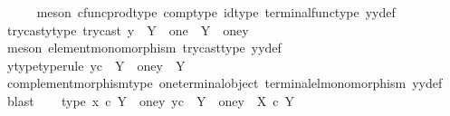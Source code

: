 \begin{isabellebody}
\ \ \ \ \isamarkupfalse%
\ {\isacharparenleft}{\kern0pt}meson\ cfunc{\isacharunderscore}{\kern0pt}prod{\isacharunderscore}{\kern0pt}type\ comp{\isacharunderscore}{\kern0pt}type\ id{\isacharunderscore}{\kern0pt}type\ terminal{\isacharunderscore}{\kern0pt}func{\isacharunderscore}{\kern0pt}type\ y{}y{}{\isacharunderscore}{\kern0pt}def{\isacharparenright}{\kern0pt}\isanewline
\ \ \isamarkupfalse%
\ trycast{\isacharunderscore}{\kern0pt}y{}{\isacharunderscore}{\kern0pt}type{\isacharcolon}{\kern0pt}\ {\isachardoublequoteopen}try{\isacharunderscore}{\kern0pt}cast\ y{}\ {\isacharcolon}{\kern0pt}\ Y\ {\isasymrightarrow}\ one\ {\isasymCoprod}\ {\isacharparenleft}{\kern0pt}Y\ {\isasymsetminus}\ {\isacharparenleft}{\kern0pt}one{\isacharcomma}{\kern0pt}y{}{\isacharparenright}{\kern0pt}{\isacharparenright}{\kern0pt}{\isachardoublequoteclose}\isanewline
\ \ \ \ \isamarkupfalse%
\ {\isacharparenleft}{\kern0pt}meson\ element{\isacharunderscore}{\kern0pt}monomorphism\ try{\isacharunderscore}{\kern0pt}cast{\isacharunderscore}{\kern0pt}type\ y{}y{}{\isacharunderscore}{\kern0pt}def{\isacharparenright}{\kern0pt}\isanewline
\ \ \isamarkupfalse%
\ y{}{\isacharprime}{\kern0pt}{\isacharunderscore}{\kern0pt}type{\isacharbrackleft}{\kern0pt}type{\isacharunderscore}{\kern0pt}rule{\isacharbrackright}{\kern0pt}{\isacharcolon}{\kern0pt}\ {\isachardoublequoteopen}y{}\isactrlsup c\ {\isacharcolon}{\kern0pt}\ Y\ {\isasymsetminus}\ {\isacharparenleft}{\kern0pt}one{\isacharcomma}{\kern0pt}y{}{\isacharparenright}{\kern0pt}\ {\isasymrightarrow}\ Y{\isachardoublequoteclose}\isanewline
\ \ \ \ \isamarkupfalse%
\ complement{\isacharunderscore}{\kern0pt}morphism{\isacharunderscore}{\kern0pt}type\ one{\isacharunderscore}{\kern0pt}terminal{\isacharunderscore}{\kern0pt}object\ terminal{\isacharunderscore}{\kern0pt}el{\isacharunderscore}{\kern0pt}monomorphism\ y{}y{}{\isacharunderscore}{\kern0pt}def\ \isamarkupfalse%
\ blast\isanewline
\ \ \isamarkupfalse%
\ type{}{\isacharcolon}{\kern0pt}\ {\isachardoublequoteopen}{\isasymlangle}x{}\ {\isasymcirc}\isactrlsub c\ {\isasymbeta}\isactrlbsub Y\ {\isasymsetminus}\ {\isacharparenleft}{\kern0pt}one{\isacharcomma}{\kern0pt}y{}{\isacharparenright}{\kern0pt}\isactrlesub {\isacharcomma}{\kern0pt}\ y{}\isactrlsup c{\isasymrangle}\ {\isacharcolon}{\kern0pt}\ Y\ {\isasymsetminus}\ {\isacharparenleft}{\kern0pt}one{\isacharcomma}{\kern0pt}y{}{\isacharparenright}{\kern0pt}\ {\isasymrightarrow}\ {\isacharparenleft}{\kern0pt}X\ {\isasymtimes}\isactrlsub c\ Y{\isacharparenright}{\kern0pt}{\isachardoublequoteclose}\isanewline

\end{isabellebody}

